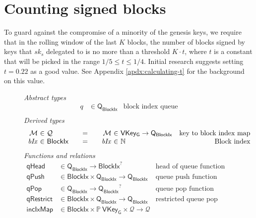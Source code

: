 \documentclass[11pt,a4paper]{article}
\newcommand{\powerset}[1]{\mathbb{P}~#1}
\newcommand{\var}[1]{\mathit{#1}}
\newcommand{\fun}[1]{\mathsf{#1}}
\newcommand{\type}[1]{\mathsf{#1}}
\newcommand{\totalf}{\to}
\newcommand{\BlockIx}{\type{BlockIx}}
\newcommand{\Queue}{\type{Q}}
\newcommand{\VKeyGen}{\type{VKey_G}}
\newcommand{\signmapname}{\mathcal{M}}
\newcommand{\incixmapname}{incIxMap}
\newcommand{\qrestrname}{qRestrict}
\newcommand{\qpopname}{qPop}
\newcommand{\qheadname}{qHead}
\newcommand{\qpushname}{qPush}
\newcommand{\mapqueue}{\mathcal{Q}}
\begin{document}
\clearpage
\section{Counting signed blocks}

\newcommand{\BSCEnv}{\type{BSCEnv}}
\newcommand{\BSCState}{\type{BSCState}}

To guard against the compromise of a minority of the genesis keys,
we require that in the rolling window of the last $K$ blocks, the number of
blocks signed by keys that $sk_s$ delegated to is no more than a threshold $K
\cdot t$, where $t$ is a constant that will be picked in the range
$1/5 \leq t \leq 1/4$. Initial research suggests setting $t=0.22$ as a good
value. See Appendix \ref{apdx:calculating-t} for the background on this value.

\begin{figure}[ht]
  \emph{Abstract types}
  \begin{align*}
    q  & \in \Queue_\BlockIx  & \text{block index queue}\\
  \end{align*}
  \emph{Derived types}
  \begin{equation*}
    \begin{array}{r@{~\in~}l@{\qquad=\qquad}r@{~\in~}lr}
      \signmapname & \mapqueue & \signmapname & \VKeyGen \totalf \Queue_\BlockIx & \text{key to block index map}\\
      \var{bIx} & \BlockIx & \var{bIx} & \mathbb{N} & \text{Block index}
    \end{array}
  \end{equation*}
  \emph{Functions and relations}
  \begin{align*}
    \fun{\qheadname} & \in \Queue_\BlockIx \totalf \BlockIx^? & \text{head of queue function} \\
    \fun{\qpushname} & \in \BlockIx \times \Queue_\BlockIx \totalf \Queue_\BlockIx
                                                              & \text{queue push function} \\
    \fun{\qpopname} & \in \Queue_\BlockIx \totalf {\Queue_\BlockIx}^?
                                                              & \text{queue pop function} \\
    \fun{\qrestrname} & \in \BlockIx \times \Queue_\BlockIx \totalf \Queue_\BlockIx
                                                              & \text{restricted queue pop function} \\
    \fun{\incixmapname} & \in \BlockIx \times \powerset \VKeyGen \times \mapqueue \totalf \mapqueue

\end{align*}
\end{figure}
\end{document}

